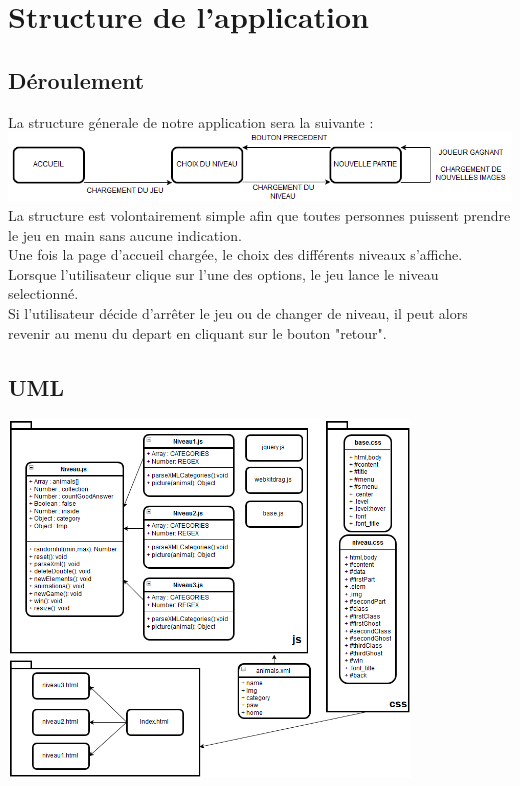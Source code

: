 \documentclass{article}
\begin{document}
\section{Structure de l'application}

\subsection{D\'eroulement}

La structure g\'enerale de notre application sera la suivante :
\vspace{0.5cm}\\
\includegraphics[width=\textwidth]{plan}
\vspace{0.5cm}\\
\hspace*{0.6cm}La structure est volontairement simple afin que toutes personnes puissent prendre le jeu en main sans aucune indication.\\
Une fois la page d'accueil charg\'ee, le choix des diff\'erents niveaux s'affiche. Lorsque l'utilisateur clique sur l'une des options, le jeu lance le niveau selectionn\'e.\\
Si l'utilisateur d\'ecide d'arr\^eter le jeu ou de changer de niveau, il peut alors revenir au menu du depart en cliquant sur le bouton "retour". 

\subsection{UML}

\begin{center}
\includegraphics[width=0.8\textwidth]{planUml}\\
\end{center}
\end{document}
